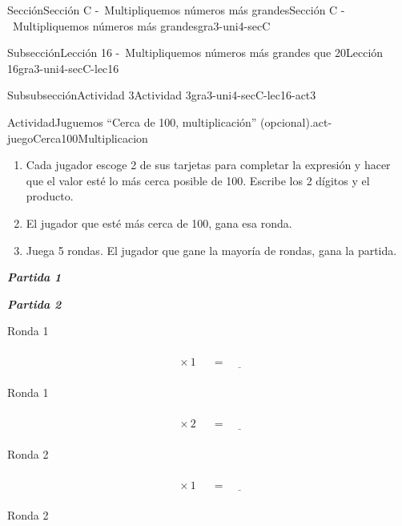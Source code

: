 \documentclass[twoside,10pt,]{article}
\newcommand{\alert}[1]{\textbf{\textit{#1}}}
\begin{document}
\begin{sectionptx}{Sección}{Sección C -~Multipliquemos números más grandes}{}{Sección C -~Multipliquemos números más grandes}{}{}{gra3-uni4-secC}
\begin{subsectionptx}{Subsección}{Lección 16 -~Multipliquemos números más grandes que 20}{}{Lección 16}{}{}{gra3-uni4-secC-lec16}
\begin{subsubsectionptx}{Subsubsección}{Actividad 3}{}{Actividad 3}{}{}{gra3-uni4-secC-lec16-act3}
\begin{activity}{Actividad}{Juguemos “Cerca de 100, multiplicación” (opcional).}{act-juegoCerca100Multiplicacion}
\begin{enumerate}
\item{}Cada jugador escoge 2 de sus tarjetas para completar la expresión y hacer que el valor esté lo más cerca posible de 100. Escribe los 2 dígitos y el producto.%
\item{}El jugador que esté más cerca de 100, gana esa ronda.%
\item{}Juega 5 rondas. El jugador que gane la mayoría de rondas, gana la partida.%
\end{enumerate}
\begin{sidebyside}{2}{0}{0}{0.1}%
\begin{sbspanel}{0.45}%
\alert{Partida 1}%
\end{sbspanel}%
\begin{sbspanel}{0.45}%
\par
\alert{Partida 2}%
\end{sbspanel}%
\end{sidebyside}%
\begin{sidebyside}{2}{0}{0}{0.1}%
\begin{sbspanel}{0.45}%
Ronda 1%
\par
%
\begin{equation*}
\boxed{\phantom{\frac{00}{00}}} \times 1 \ \boxed{\phantom{\frac{00}{00}}}= \underline{\hspace{1cm}}
\end{equation*}
%
\end{sbspanel}%
\begin{sbspanel}{0.45}%
Ronda 1%
\par
%
\begin{equation*}
\boxed{\phantom{\frac{00}{00}}} \times 2 \ \boxed{\phantom{\frac{00}{00}}}= \underline{\hspace{1cm}}
\end{equation*}
%
\end{sbspanel}%
\end{sidebyside}%
\begin{sidebyside}{2}{0}{0}{0.1}%
\begin{sbspanel}{0.45}%
Ronda 2%
\par
%
\begin{equation*}
\boxed{\phantom{\frac{00}{00}}} \times 1 \ \boxed{\phantom{\frac{00}{00}}}= \underline{\hspace{1cm}}
\end{equation*}
%
\end{sbspanel}%
\begin{sbspanel}{0.45}%
Ronda 2%
\par
%
\begin{equation*}

\end{equation*}
\end{sbspanel}
\end{sidebyside}
\end{activity}
\end{subsubsectionptx}
\end{subsectionptx}
\end{sectionptx}
\end{document}
